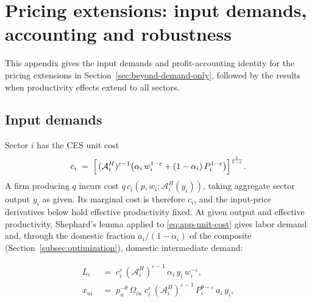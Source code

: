 \section{Pricing extensions: input demands, accounting and robustness}\label{app:pricing-extensions}

This appendix gives the input demands and profit-accounting identity for the
pricing extensions in Section~\ref{sec:beyond-demand-only}, followed by the
results when productivity effects extend to all sectors.

\subsection{Input demands}\label{app:pricing-hooks}
Sector $i$ has the CES unit cost
\begin{equation}\label{eq:app-unit-cost}
  c_i \;=\; \Bigl[\,(\mathcal{A}_i^{H})^{\varepsilon-1}\bigl(\alpha_i\,w_i^{1-\varepsilon}
     + (1-\alpha_i)\,P_i^{1-\varepsilon}\bigr)\Bigr]^{\frac{1}{1-\varepsilon}}.
\end{equation}
A firm producing $q$ incurs cost $q\,c_i(p,w_i;\mathcal{A}_i^{H}(y_i))$, taking aggregate sector output $y_i$ as given. Its marginal cost is therefore $c_i$, and the input-price derivatives below hold effective productivity fixed.
At given output and effective productivity, Shephard's lemma applied to \eqref{eq:app-unit-cost} gives labor demand and, through the domestic fraction $a_i/(1-\alpha_i)$ of the composite (Section~\ref{subsec:optimization}), domestic intermediate demand:

\begin{align}
  L_i \;&=\; c_i^{\varepsilon}\,(\mathcal{A}_i^{H})^{\varepsilon-1}\,\alpha_i\,y_i\,w_i^{-\varepsilon},
  \label{eq:app-labor}\\
  x_{ui} \;&=\; p_u^{-\theta}\,\Omega_{iu}\;c_i^{\varepsilon}\,
     (\mathcal{A}_i^{H})^{\varepsilon-1}\,P_i^{\theta-\varepsilon}\,a_i\,y_i ,
  \label{eq:app-intermediate}
\end{align}

